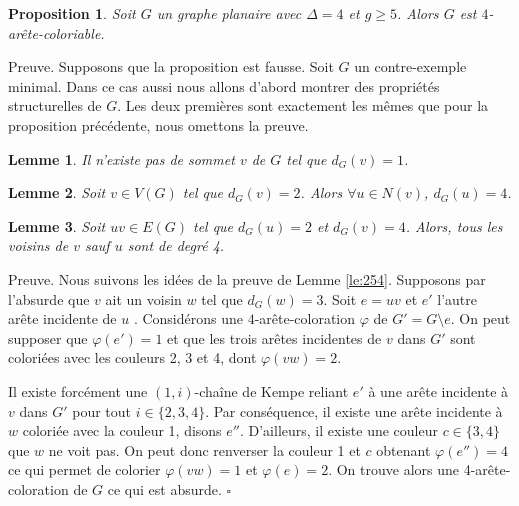 \documentclass[10pt,a4paper]{article}
\newtheorem{proposition}{Proposition}
\newtheorem{lemme}{Lemme}
\newcommand{\ep}{{\hfill $\square$}}
\begin{document}

\begin{proposition}
Soit $G$ un graphe planaire avec $\Delta = 4$ et $g \geq 5$. Alors $G$ est $4$-arête-coloriable.
\end{proposition}

Preuve. Supposons que la proposition est fausse. Soit $G$ un contre-exemple minimal. Dans ce cas aussi nous allons d'abord montrer des propriétés structurelles de $G$. Les deux premières sont exactement les mêmes que pour la proposition précédente, nous omettons la preuve.

\begin{lemme}
Il n'existe pas de sommet $v$ de $G$ tel que $d_G(v) = 1$.
\label{le:14}
\end{lemme}

\begin{lemme}
Soit $v \in V(G)$ tel que $d_G(v) = 2$. Alors $\forall u \in N(v)$, $d_G(u) = 4$.
\label{le:23}
\end{lemme} 


\begin{lemme}
Soit $uv \in E(G)$ tel que $d_G(u) = 2$ et $d_G(v) = 4$. Alors, tous les voisins de $v$ sauf $u$ sont de degré 4.
\label{le:243}
\end{lemme}

Preuve. Nous suivons les idées de la preuve de Lemme \ref{le:254}.
Supposons par l'absurde que $v$ ait un voisin $w$ tel que $d_G(w) = 3$. Soit $e = uv$ et $e'$ l'autre arête incidente de $u$ . Considérons une $4$-arête-coloration $\varphi$ de $G' = G \setminus e$. On peut supposer que $\varphi(e') = 1$ et que les trois arêtes incidentes de $v$ dans $G'$ sont coloriées avec les couleurs 2, 3 et 4, dont $\varphi(vw) = 2$.

Il existe forcément une $(1,i)$-chaîne de Kempe reliant $e'$ à une arête incidente à $v$ dans $G'$ pour tout $i \in \{2,3,4\}$. Par conséquence, il existe une arête incidente à $w$ coloriée avec la couleur 1, disons $e''$. D'ailleurs, il existe une couleur $c\in \{3,4\}$ que $w$ ne voit pas. On peut donc renverser la couleur 1 et $c$ obtenant $\varphi(e'') = 4$ ce qui permet de colorier $\varphi(vw) = 1$ et $\varphi(e) = 2$. On trouve alors une 4-arête-coloration de $G$ ce qui est absurde.
\ep
\end{document}
